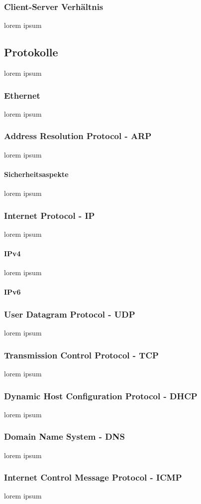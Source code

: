 \documentclass[12pt,a4paper]{report}
\begin{document}
\subsubsection{Client-Server Verhältnis}
lorem ipsum
\subsection{Protokolle}
lorem ipsum
\subsubsection{Ethernet}
lorem ipsum
\subsubsection{Address Resolution Protocol - ARP}
lorem ipsum
\paragraph{Sicherheitsaspekte}
lorem ipsum
\subsubsection{Internet Protocol - IP}
lorem ipsum
\paragraph{IPv4}
lorem ipsum
\paragraph{IPv6}
\subsubsection{User Datagram Protocol - UDP}
lorem ipsum
\subsubsection{Transmission Control Protocol - TCP}
lorem ipsum
\subsubsection{Dynamic Host Configuration Protocol - DHCP}
lorem ipsum
\subsubsection{Domain Name System - DNS}
lorem ipsum
\subsubsection{Internet Control Message Protocol - ICMP}
lorem ipsum 
\end{document}
